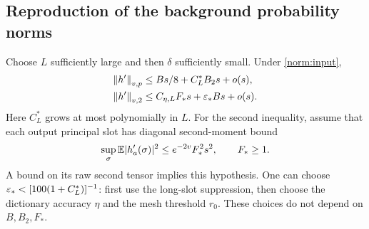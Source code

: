 \subsection{Reproduction of the background probability norms}
\begin{proposition}\label{norm:reproduction}
Choose $L$ sufficiently large and then $\delta$ sufficiently small.
Under \eqref{norm:input},
\begin{align}
 \left\lVert h'\right\rVert_{v,p}&\le Bs/8+C_L^*B_2s+o(s),\label{norm:high-reproduction}\\
 \left\lVert h'\right\rVert_{v,2}&\le C_{\eta,L}F_*s+\varepsilon_* Bs+o(s).
                                                    \label{norm:L2-reproduction}
\end{align}
Here $C_L^*$ grows at most polynomially in $L$.  For the second inequality,
assume that each output principal slot has diagonal second-moment
bound
\begin{equation}\label{norm:diagonal}
 \sup_\sigma\mathbb E|h'_a(\sigma)|^2\le e^{-2v}F_*^2s^2,
 \qquad F_*\ge1.
\end{equation}
A bound on its raw second tensor implies this hypothesis.  One can
choose $\varepsilon_*<[100(1+C_L^*)]^{-1}$: first use the long-slot suppression,
then choose the dictionary accuracy $\eta$ and the mesh threshold $r_0$.
These choices do not depend on $B,B_2,F_*$.
\end{proposition}
